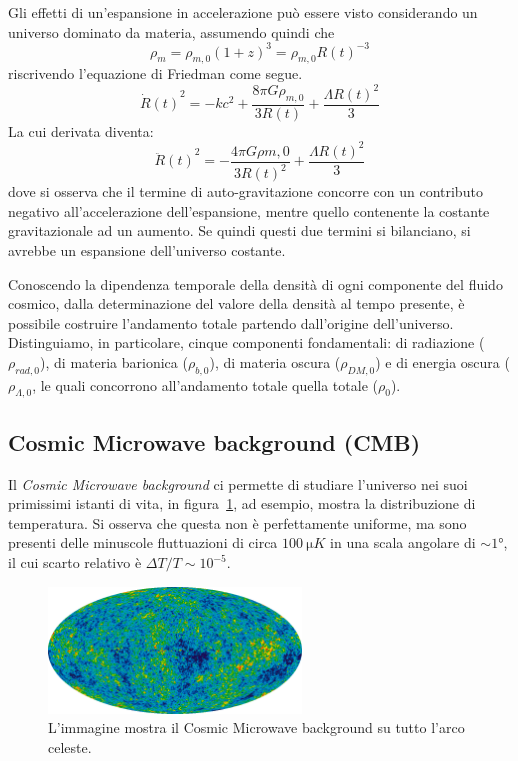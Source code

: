 Gli effetti di un'espansione in accelerazione può essere visto considerando un universo dominato da materia, assumendo quindi che
\[
    \rho_{m} = \rho_{m, 0}{(1+z)}^3 = \rho_{m,0}{R(t)}^{-3}
\]
riscrivendo l'equazione di Friedman come segue.
\[
    {\dot{R}(t)}^2 = - kc^2 + \frac{8\pi G \rho_{m,0}}{3R(t)} + \frac{\Lambda {R(t)}^2}{3}
\]
La cui derivata diventa:
\[
    {\ddot{R}(t)}^2 = -\frac{4\pi G \rho{m,0}}{3{R(t)}^2}+ \frac{\Lambda {R(t)}^2}{3}
\]
dove si osserva che il termine di auto-gravitazione concorre con un contributo negativo all'accelerazione dell'espansione, mentre quello contenente la costante gravitazionale ad un aumento. Se quindi questi due termini si bilanciano, si avrebbe un espansione dell'universo costante.

Conoscendo la dipendenza temporale della densità di ogni componente del fluido cosmico, dalla determinazione del valore della densità al tempo presente, è possibile costruire l'andamento totale partendo dall'origine dell'universo. Distinguiamo, in particolare, cinque componenti fondamentali: di radiazione ($\rho_{rad, 0}$), di materia barionica ($\rho_{b, 0}$), di materia oscura ($\rho_{DM, 0}$) e di energia oscura ($\rho_{\Lambda, 0}$, le quali concorrono all'andamento totale quella totale ($\rho_{0}$).

\subsection{Cosmic Microwave background (CMB)}\label{sec:CMB}
Il \textit{Cosmic Microwave background} ci permette di studiare l'universo nei suoi primissimi istanti di vita, in figura~\ref{fig:CMB1}, ad esempio, mostra la distribuzione di temperatura. Si osserva che questa non è perfettamente uniforme, ma sono presenti delle minuscole fluttuazioni di circa $\SI{100}{\micro K}$ in una scala angolare di $\sim 1\si{\degree}$, il cui scarto relativo è $\Delta T/T \sim 10^{-5}$.
\begin{figure}
    \centering
    \includegraphics[width = 0.6\textwidth]{immagini/CMB1.png}
    \caption{L'immagine mostra il Cosmic Microwave background su tutto l'arco celeste.}\label{fig:CMB1}
\end{figure}

